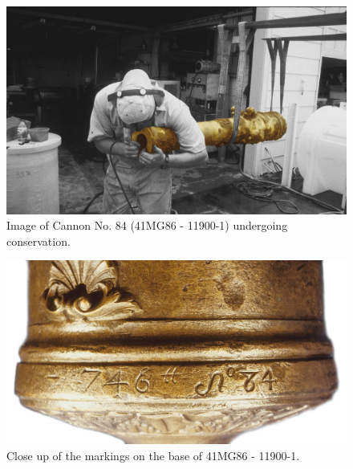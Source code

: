 \documentclass[review]{elsarticle}
\begin{document}
\begin{figure}[ht]\centering
\includegraphics[width=\linewidth]{FigConserve2}
\caption{Image of Cannon No. 84 (41MG86 - 11900-1) undergoing conservation.}
\label{fig:FigConserve}
\end{figure}

\begin{figure}[ht]\centering
\includegraphics[width=\linewidth]{FigBASE2}
\caption{Close up of the markings on the base of 41MG86 - 11900-1.}
\label{fig:FigBASE}
\end{figure}
\end{document}
